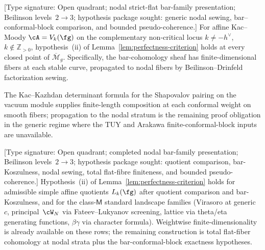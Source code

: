 \begin{conjecture}
\label{conj:perfectness-boundary-km-generic}%
\ClaimStatusConjectured
{}%
\textup{[Type signature: Open quadrant; nodal strict-flat bar-family
presentation; Beilinson levels~\(2\to3\); hypothesis package sought:
generic nodal sewing, bar--conformal-block comparison, and bounded
pseudo-coherence.]}
For affine Kac--Moody $\cA = V_k(\fg)$ on the complementary
non-critical locus $k \neq -h^\vee$, $k\notin\mathbb Z_{>0}$,
hypothesis~\textup{(ii)} of
Lemma~\textup{\ref{lem:perfectness-criterion}} holds at every
closed point of $\overline{\mathcal{M}}_g$. Specifically, the
bar-cohomology sheaf has finite-dimensional fibers at each stable
curve, propagated to nodal fibers by Beilinson--Drinfeld
factorization sewing.

The Kac--Kazhdan determinant formula for the Shapovalov pairing on
the vacuum module supplies finite-length composition at each
conformal weight on smooth fibers; propagation to the nodal stratum
is the remaining proof obligation in the generic regime where the
TUY and Arakawa finite-conformal-block inputs are unavailable.
\end{conjecture}

\begin{conjecture}
\label{conj:perfectness-boundary-class-M}
\ClaimStatusConjectured
{}%
\textup{[Type signature: Open quadrant; completed nodal bar-family
presentation; Beilinson levels~\(2\to3\); hypothesis package sought:
quotient comparison, bar-Koszulness, nodal sewing, total
flat-fibre finiteness, and bounded pseudo-coherence.]}
Hypothesis~\textup{(ii)} of
Lemma~\textup{\ref{lem:perfectness-criterion}} holds for admissible
simple affine quotients $L_k(\fg)$ after quotient comparison and
bar-Koszulness, and for the class-$\mathsf{M}$ standard landscape
families (Virasoro at generic~$c$, principal~$\cW_N$ via
Fateev--Lukyanov screening, lattice via theta/eta generating
functions, $\beta\gamma$ via character formula). Weightwise
finite-dimensionality is already available on these rows; the
remaining construction is total flat-fiber cohomology at nodal strata plus the
bar-conformal-block exactness hypotheses.
\end{conjecture}

